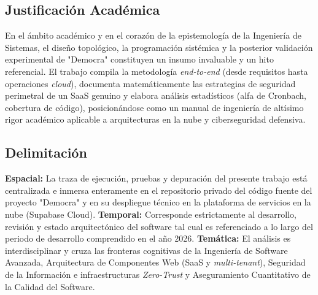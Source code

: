 \subsection{Justificación Académica}
En el ámbito académico y en el corazón de la epistemología de la Ingeniería de Sistemas, el diseño topológico, la programación sistémica y la posterior validación experimental de "Democra" constituyen un insumo invaluable y un hito referencial. El trabajo compila la metodología \textit{end-to-end} (desde requisitos hasta operaciones \textit{cloud}), documenta matemáticamente las estrategias de seguridad perimetral de un SaaS genuino y elabora análisis estadísticos (alfa de Cronbach, cobertura de c\'odigo), posicionándose como un manual de ingeniería de altísimo rigor académico aplicable a arquitecturas en la nube y ciberseguridad defensiva.

\subsection{Delimitación}
\textbf{Espacial:} La traza de ejecución, pruebas y depuración del presente trabajo está centralizada e inmersa enteramente en el repositorio privado del código fuente del proyecto "Democra" y en su despliegue técnico en la plataforma de servicios en la nube (Supabase Cloud). \textbf{Temporal:} Corresponde estrictamente al desarrollo, revisión y estado arquitectónico del software tal cual es referenciado a lo largo del periodo de desarrollo comprendido en el año 2026. \textbf{Temática:} El análisis es interdisciplinar y cruza las fronteras cognitivas de la Ingeniería de Software Avanzada, Arquitectura de Componentes Web (SaaS y \textit{multi-tenant}), Seguridad de la Información e infraestructuras \textit{Zero-Trust} y Aseguramiento Cuantitativo de la Calidad del Software.

